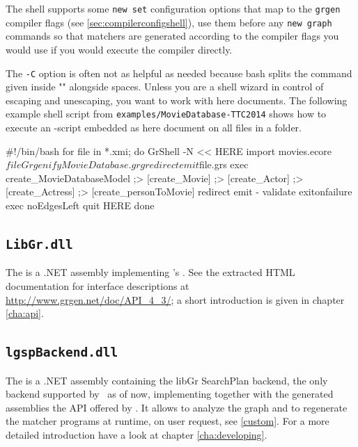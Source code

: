 \begin{note}
The shell supports some \texttt{new set} configuration options that map to the \texttt{grgen} compiler flags (see \ref{sec:compilerconfigshell}), use them before any \texttt{new graph} commands so that matchers are generated according to the compiler flags you would use if you would execute the compiler directly.
\end{note}

\begin{example}
The \texttt{-C} option is often not as helpful as needed because bash splits the command given inside "" alongside spaces.
Unless you are a shell wizard in control of escaping and unescaping, you want to work with here documents.
The following example shell script from \texttt{examples/MovieDatabase-TTC2014} shows how to execute an \GrShell-script embedded as here document on all files in a folder.
\begin{grshell}
#!/bin/bash
for file in *.xmi; do	
    GrShell -N << HERE
import movies.ecore $file GrgenifyMovieDatabase.grg
redirect emit $file.grs
exec create_MovieDatabaseModel ;> [create_Movie] ;> [create_Actor] ;> [create_Actress] ;> [create_personToMovie]
redirect emit - 
validate exitonfailure exec noEdgesLeft
quit
HERE
done
\end{grshell}
\end{example}

\subsection{\texttt{LibGr.dll}}
\label{sct:API}
The \LibGr{} is a .NET assembly implementing \GrG's .
See the extracted HTML documentation for interface descriptions at \url{http://www.grgen.net/doc/API_4_3/};
a short introduction is given in chapter \ref{cha:api}.

\subsection{\texttt{lgspBackend.dll}}
The \LGSPBackend{} is a .NET assembly containing the libGr SearchPlan backend, the only backend supported by \GrG~as of now, implementing together with the generated assemblies the API offered by \LibGr.
It allows to analyze the graph and to regenerate the matcher programs at runtime, on user request, see \ref{custom}.
For a more detailed introduction have a look at chapter \ref{cha:developing}.

